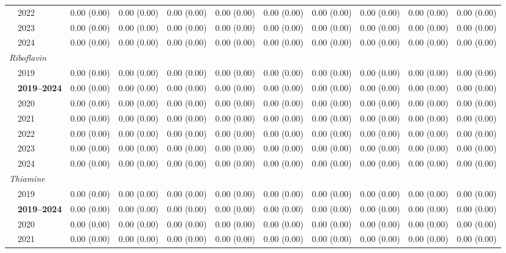 \begin{table}[htbp]
\begin{tabular}{llrrrrrrrrr}
 & 2022 & 0.00 (0.00) & 0.00 (0.00) & 0.00 (0.00) & 0.00 (0.00) & 0.00 (0.00) & 0.00 (0.00) & 0.00 (0.00) & 0.00 (0.00) & 0.00 (0.00) \\
 & 2023 & 0.00 (0.00) & 0.00 (0.00) & 0.00 (0.00) & 0.00 (0.00) & 0.00 (0.00) & 0.00 (0.00) & 0.00 (0.00) & 0.00 (0.00) & 0.00 (0.00) \\
 & 2024 & 0.00 (0.00) & 0.00 (0.00) & 0.00 (0.00) & 0.00 (0.00) & 0.00 (0.00) & 0.00 (0.00) & 0.00 (0.00) & 0.00 (0.00) & 0.00 (0.00) \\
\midrule
\multicolumn{11}{l}{\textit{Riboflavin}} \\
 & 2019 & 0.00 (0.00) & 0.00 (0.00) & 0.00 (0.00) & 0.00 (0.00) & 0.00 (0.00) & 0.00 (0.00) & 0.00 (0.00) & 0.00 (0.00) & 0.00 (0.00) \\
 & \textbf{2019–2024} & 0.00 (0.00) & 0.00 (0.00) & 0.00 (0.00) & 0.00 (0.00) & 0.00 (0.00) & 0.00 (0.00) & 0.00 (0.00) & 0.00 (0.00) & 0.00 (0.00) \\
 & 2020 & 0.00 (0.00) & 0.00 (0.00) & 0.00 (0.00) & 0.00 (0.00) & 0.00 (0.00) & 0.00 (0.00) & 0.00 (0.00) & 0.00 (0.00) & 0.00 (0.00) \\
 & 2021 & 0.00 (0.00) & 0.00 (0.00) & 0.00 (0.00) & 0.00 (0.00) & 0.00 (0.00) & 0.00 (0.00) & 0.00 (0.00) & 0.00 (0.00) & 0.00 (0.00) \\
 & 2022 & 0.00 (0.00) & 0.00 (0.00) & 0.00 (0.00) & 0.00 (0.00) & 0.00 (0.00) & 0.00 (0.00) & 0.00 (0.00) & 0.00 (0.00) & 0.00 (0.00) \\
 & 2023 & 0.00 (0.00) & 0.00 (0.00) & 0.00 (0.00) & 0.00 (0.00) & 0.00 (0.00) & 0.00 (0.00) & 0.00 (0.00) & 0.00 (0.00) & 0.00 (0.00) \\
 & 2024 & 0.00 (0.00) & 0.00 (0.00) & 0.00 (0.00) & 0.00 (0.00) & 0.00 (0.00) & 0.00 (0.00) & 0.00 (0.00) & 0.00 (0.00) & 0.00 (0.00) \\
\midrule
\multicolumn{11}{l}{\textit{Thiamine}} \\
 & 2019 & 0.00 (0.00) & 0.00 (0.00) & 0.00 (0.00) & 0.00 (0.00) & 0.00 (0.00) & 0.00 (0.00) & 0.00 (0.00) & 0.00 (0.00) & 0.00 (0.00) \\
 & \textbf{2019–2024} & 0.00 (0.00) & 0.00 (0.00) & 0.00 (0.00) & 0.00 (0.00) & 0.00 (0.00) & 0.00 (0.00) & 0.00 (0.00) & 0.00 (0.00) & 0.00 (0.00) \\
 & 2020 & 0.00 (0.00) & 0.00 (0.00) & 0.00 (0.00) & 0.00 (0.00) & 0.00 (0.00) & 0.00 (0.00) & 0.00 (0.00) & 0.00 (0.00) & 0.00 (0.00) \\
 & 2021 & 0.00 (0.00) & 0.00 (0.00) & 0.00 (0.00) & 0.00 (0.00) & 0.00 (0.00) & 0.00 (0.00) & 0.00 (0.00) & 0.00 (0.00) & 0.00 (0.00) \\

\end{tabular}
\end{table}
